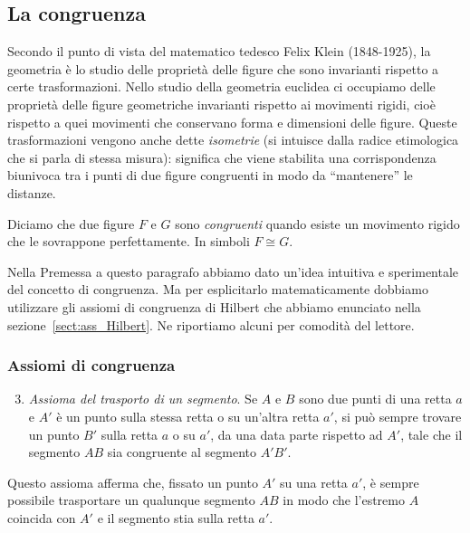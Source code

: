 \subsection{La congruenza}

Secondo il punto di vista del matematico tedesco Felix Klein 
(1848-1925), la geometria è lo studio delle proprietà delle figure 
che sono invarianti rispetto a certe trasformazioni. Nello studio 
della geometria euclidea ci occupiamo delle proprietà delle figure geometriche invarianti 
rispetto ai movimenti rigidi, cioè rispetto a quei movimenti che 
conservano forma e dimensioni delle figure. Queste trasformazioni 
vengono anche dette \emph{isometrie} (si intuisce dalla radice 
etimologica che si parla di stessa misura): significa che viene 
stabilita una corrispondenza biunivoca tra i punti di due figure 
congruenti in modo da ``mantenere'' le distanze.

\begin{definizione}
Diciamo che due figure $F$ e $G$ sono \emph{congruenti} quando esiste 
un movimento rigido che le sovrappone perfettamente. In simboli 
$F\cong G$.
\end{definizione}

Nella Premessa a questo paragrafo abbiamo dato un'idea intuitiva e 
sperimentale del concetto di congruenza. Ma per esplicitarlo 
matematicamente dobbiamo utilizzare gli assiomi di congruenza di 
Hilbert che abbiamo enunciato nella sezione~\ref{sect:ass_Hilbert}. 
Ne riportiamo alcuni per comodità del lettore.


\subsubsection{Assiomi di congruenza}

\begin{enumerate}[label=\Roman{*}.]
\setcounter{enumi}{2}
\item \emph{Assioma del trasporto di un segmento}. Se $A$ e $B$ sono 
due punti di una retta $a$ e $A'$ è un punto sulla stessa retta o su 
un'altra retta $a'$, si può sempre trovare un punto $B'$ sulla retta 
$a$ o su $a'$, da una data parte rispetto ad $A'$, tale che il 
segmento $AB$ sia congruente al segmento $A'B'$.
\end{enumerate}
Questo assioma afferma che, fissato un punto $A'$ su una retta $a'$, 
è sempre possibile trasportare un qualunque segmento $AB$ in modo che 
l'estremo $A$ coincida con $A'$ e il segmento stia sulla retta $a'$.

